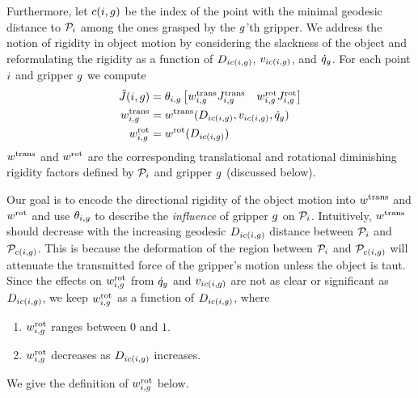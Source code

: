Furthermore, let $c(i, g)$ be the index of the point with the minimal geodesic distance to $\mathcal{P}_i$ among the ones grasped by the $g$'th gripper. We address the notion of rigidity in object motion by considering the slackness of the object and reformulating the rigidity as a function of $D_{i c(i, g)}$, $v_{i c(i, g)}$, and $\dot{q}_g$. For each point $i$ and gripper $g$ we compute
\begin{equation}
\begin{split}
    \tilde {J}(i, g) 
                        &= \theta_{i, g} \begin{bmatrix} w^{\textrm{trans}}_{i, g} J^{\textrm{trans}}_{i, g} & w^{\textrm{rot}}_{i, g} J^{\textrm{rot}}_{i, g} \end{bmatrix} \\
    w^{\textrm{trans}}_{i, g}    &= w^{\textrm{trans}}(D_{i c(i, g)}, v_{i c(i, g)}, \dot{q}_g) \\
    w^{\textrm{rot}}_{i, g}      &= w^{\textrm{rot}}(D_{i c(i, g)}) \\
\end{split}
\label{eq:trans_rot_rigidity_diminishing_jacobian}
\end{equation}
$w^{\textrm{trans}}$ and $w^{\textrm{rot}}$ are the corresponding translational and rotational diminishing rigidity factors defined by $\mathcal{P}_i$ and gripper $g$ (discussed below). 

Our goal is to encode the directional rigidity of the object motion into $w^{\textrm{trans}}$ and $w^{\textrm{rot}}$ and use $\theta_{i, g}$ to describe the \textit{influence} of gripper $g$ on $\mathcal{P}_i$. Intuitively, $w^{\textrm{trans}}$ should decrease with the increasing geodesic $D_{i c(i, g)}$ distance between $\mathcal{P}_i$ and $\mathcal{P}_{c(i, g)}$. This is because the deformation of the region between $\mathcal{P}_i$ and $\mathcal{P}_{c(i, g)}$ will attenuate the transmitted force of the gripper's motion unless the object is taut. Since the effects on $w^{\textrm{rot}}_{i, g}$ from $\dot{q}_g$ and $v_{i c(i, g)}$ are not as clear or significant as $D_{i c(i, g)}$, we keep $w^{\textrm{rot}}_{i, g}$ as a function of $D_{i c(i, g)}$, where 
\begin{enumerate}
    \item $w^{\textrm{rot}}_{i, g}$ ranges between $0$ and $1$.
    \item $w^{\textrm{rot}}_{i, g}$ decreases as $D_{i c(i, g)}$ increases.
\end{enumerate}
We give the definition of $w^{\textrm{rot}}_{i, g}$ below.

